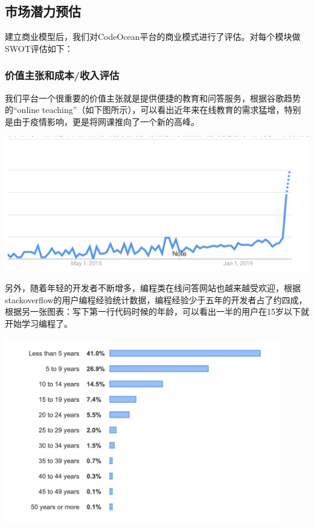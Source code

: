 \documentclass[a4paper]{ctexart}
\begin{document}
\subsection{市场潜力预估}
建立商业模型后，我们对CodeOcean平台的商业模式进行了评估。对每个模块做SWOT评估如下：
\subsubsection{价值主张和成本/收入评估}
我们平台一个很重要的价值主张就是提供便捷的教育和问答服务，根据谷歌趋势的“online teaching”（如下图所示），可以看出近年来在线教育的需求猛增，特别是由于疫情影响，更是将网课推向了一个新的高峰。

\begin{center}
  \includegraphics[width=14cm]{网课.png}
\end{center}

另外，随着年轻的开发者不断增多，编程类在线问答网站也越来越受欢迎，根据stackoverflow的用户编程经验统计数据，编程经验少于五年的开发者占了约四成，根据另一张图表：写下第一行代码时候的年龄，可以看出一半的用户在15岁以下就开始学习编程了。

\begin{center}
  \includegraphics[width=12cm]{第一行代码.png}
\end{center}
\end{document}
